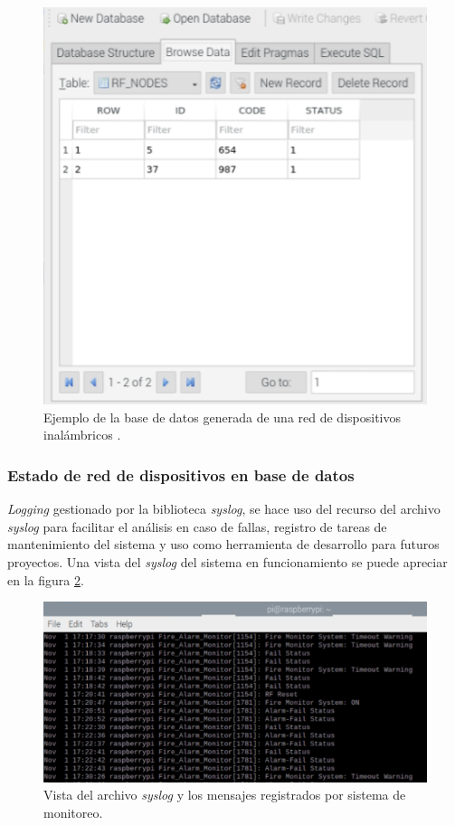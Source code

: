 \begin{figure}[ht]
	\centering
	\includegraphics[scale=.45]{./Figures/Capitulo4/Figura_O.png}
	\caption{Ejemplo de la base de datos generada de una red de dispositivos inalámbricos .}
	\label{fig:figura_o}
\end{figure}

\break

\subsubsection{Estado de red de dispositivos en base de datos}
\textit{Logging} gestionado por la biblioteca \textit{syslog}, se hace uso del recurso del archivo \textit{syslog} para facilitar el análisis en caso de fallas, registro de tareas de mantenimiento del sistema y uso como herramienta de desarrollo para futuros proyectos. Una vista del \textit{syslog} del sistema en funcionamiento se puede apreciar en la figura \ref{fig:figura_q}.


\begin{figure}[ht]
	\centering
	\includegraphics[scale=.65]{./Figures/Capitulo4/Figura_Q.png}
	\caption{Vista del archivo \textit{syslog} y los mensajes registrados por sistema de monitoreo.}
	\label{fig:figura_q}
\end{figure}

